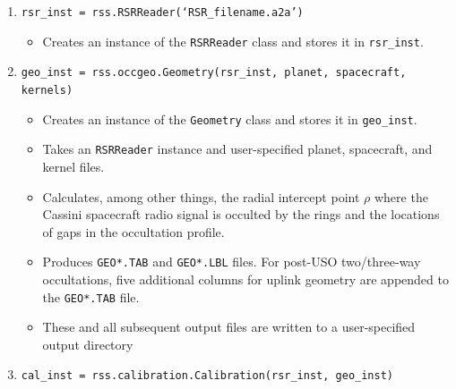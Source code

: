 \documentclass[titlepage, 12pt]{article}
\begin{document}
            \begin{enumerate}
                \item \small{\texttt{rsr\_inst =
                                     rss.RSRReader(`RSR\_filename.a2a')}}
                      \normalsize
                      \begin{itemize}
                          \item Creates an instance of the \texttt{RSRReader}
                                class and stores it in \texttt{rsr\_inst}.
                      \end{itemize}
                \item \small{\texttt{geo\_inst = rss.occgeo.Geometry(rsr\_inst,
                                     planet, spacecraft, kernels)}}
                      \normalsize
                      \begin{itemize}
                          \item Creates an instance of the
                                \texttt{Geometry} class and stores it
                                in \texttt{geo\_inst}.
                          \item Takes an \texttt{RSRReader} instance and
                                user-specified planet, spacecraft,
                                and kernel files.
                          \item Calculates, among other things,
                                the radial intercept point $\rho$ where the
                                Cassini spacecraft radio signal is occulted by
                                the rings and the locations
                                of gaps in the occultation profile.
                          \item Produces \texttt{GEO*.TAB}
                                and \texttt{GEO*.LBL} files. For post-USO two/three-way occultations, five additional columns for uplink geometry are appended to the \texttt{GEO*.TAB} file. 
                          \item These and all subsequent output files are
                                written to a user-specified output directory
                      \end{itemize}
                \item \small{\texttt{cal\_inst =
                                     rss.calibration.Calibration(rsr\_inst,
                                     geo\_inst)}}
                      \normalsize
                      \begin{itemize}

\end{itemize}
\end{enumerate}
\end{document}
